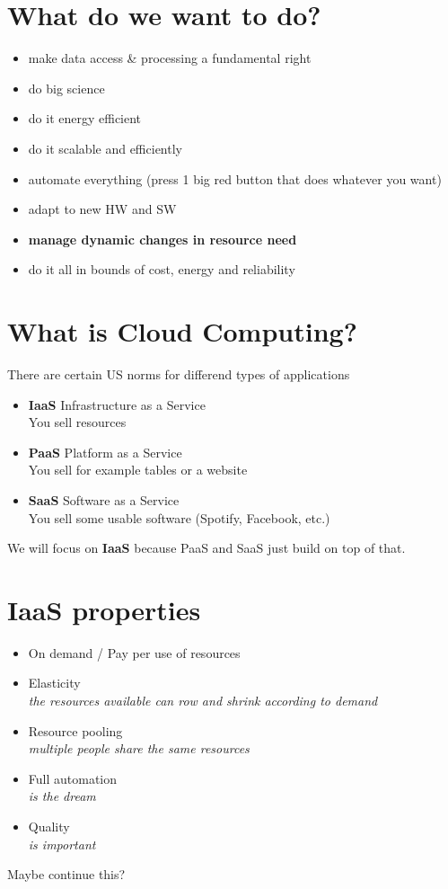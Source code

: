 \documentclass[a4paper]{article}
\begin{document}
\section{What do we want to do?}
	\begin{itemize}
	\setlength{\itemsep}{-3pt}
	\item make data access \& processing a fundamental right
	\item do big science
	\item do it energy efficient
	\item do it scalable and efficiently
	\item automate everything (press 1 big red button that does whatever you want)
	\item adapt to new HW and SW
	\item {\bf manage dynamic changes in resource need}
	\item do it all in bounds of cost, energy and reliability
	\end{itemize}
\section{What is Cloud Computing?}
	There are certain US norms for differend types of applications
	\begin{itemize}
	\setlength{\itemsep}{-3pt}
	\item {\bf IaaS} Infrastructure as a Service\\
		You sell resources
	\item {\bf PaaS} Platform as a Service\\
		You sell for example tables or a website
	\item {\bf SaaS} Software as a Service\\
		You sell some usable software (Spotify, Facebook, etc.)
	\end{itemize}
	We will focus on {\bf IaaS} because PaaS and SaaS just build on top of that.

\section{IaaS properties}
	\begin{itemize}
	\setlength{\itemsep}{-3pt}
	\item On demand / Pay per use of resources 
	\item Elasticity\\ {\it the resources available can row and shrink according to demand}
	\item Resource pooling \\{\it multiple people share the same resources}
	\item Full automation \\{\it is the dream}
	\item Quality \\{\it is important}
	\end{itemize}
	
	Maybe continue this?
	
\end{document}
